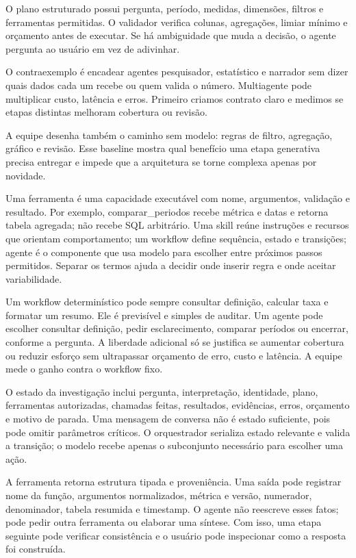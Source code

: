 O plano estruturado possui pergunta, período, medidas, dimensões, filtros e ferramentas permitidas. O validador verifica colunas, agregações, limiar mínimo e orçamento antes de executar. Se há ambiguidade que muda a decisão, o agente pergunta ao usuário em vez de adivinhar.

O contraexemplo é encadear agentes pesquisador, estatístico e narrador sem dizer quais dados cada um recebe ou quem valida o número. Multiagente pode multiplicar custo, latência e erros. Primeiro criamos contrato claro e medimos se etapas distintas melhoram cobertura ou revisão.

A equipe desenha também o caminho sem modelo: regras de filtro, agregação, gráfico e revisão. Esse baseline mostra qual benefício uma etapa generativa precisa entregar e impede que a arquitetura se torne complexa apenas por novidade.

Uma ferramenta é uma capacidade executável com nome, argumentos, validação e resultado. Por exemplo, comparar\_periodos recebe métrica e datas e retorna tabela agregada; não recebe SQL arbitrário. Uma skill reúne instruções e recursos que orientam comportamento; um workflow define sequência, estado e transições; agente é o componente que usa modelo para escolher entre próximos passos permitidos. Separar os termos ajuda a decidir onde inserir regra e onde aceitar variabilidade.

Um workflow determinístico pode sempre consultar definição, calcular taxa e formatar um resumo. Ele é previsível e simples de auditar. Um agente pode escolher consultar definição, pedir esclarecimento, comparar períodos ou encerrar, conforme a pergunta. A liberdade adicional só se justifica se aumentar cobertura ou reduzir esforço sem ultrapassar orçamento de erro, custo e latência. A equipe mede o ganho contra o workflow fixo.

O estado da investigação inclui pergunta, interpretação, identidade, plano, ferramentas autorizadas, chamadas feitas, resultados, evidências, erros, orçamento e motivo de parada. Uma mensagem de conversa não é estado suficiente, pois pode omitir parâmetros críticos. O orquestrador serializa estado relevante e valida a transição; o modelo recebe apenas o subconjunto necessário para escolher uma ação.

A ferramenta retorna estrutura tipada e proveniência. Uma saída pode registrar nome da função, argumentos normalizados, métrica e versão, numerador, denominador, tabela resumida e timestamp. O agente não reescreve esses fatos; pode pedir outra ferramenta ou elaborar uma síntese. Com isso, uma etapa seguinte pode verificar consistência e o usuário pode inspecionar como a resposta foi construída.

